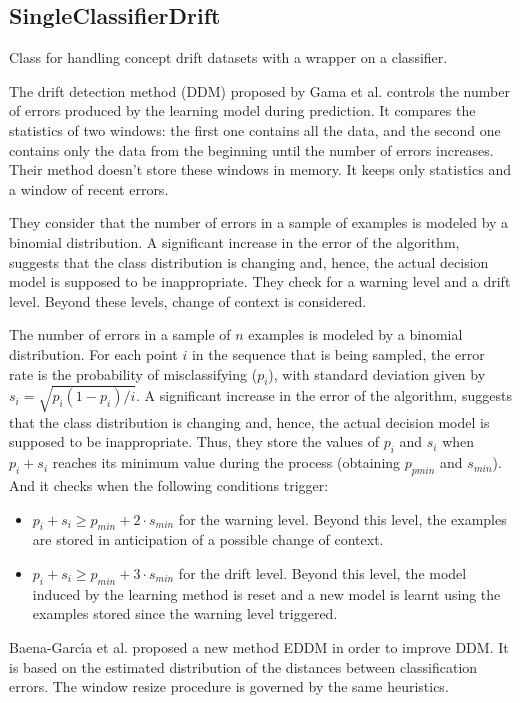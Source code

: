 \documentclass[a4paper,12pt,twoside]{book}
\begin{document}
\subsection{SingleClassifierDrift} Class for handling concept drift datasets with a wrapper on a
 classifier.

The drift detection method (DDM) proposed by Gama et al. controls 
the number of errors produced by the learning model during prediction. 
It compares the statistics of two windows: the first one contains all the data, 
and the second one contains only the data from the beginning until the number of
errors increases. Their method doesn't store these windows in memory. It keeps 
only statistics and a window of recent errors.

They consider that the number of errors in a sample of examples is modeled by a binomial 
distribution. A significant increase in the error of the algorithm, suggests
that the class distribution is changing and, hence, the actual decision model is
supposed to be inappropriate. They check for a warning level and a drift level. Beyond
these levels, change of context is considered.

The number of errors in a sample of $n$ examples is modeled by a binomial 
distribution. For each point $i$ in the sequence that is being sampled, the error
rate is the probability of misclassifying ($p_i$), with standard deviation given
by $s_i = \sqrt{p_i(1 - p_i)/i}$. 
A significant increase in the error of the algorithm, suggests
that the class distribution is changing and, hence, the actual decision model is
supposed to be inappropriate. Thus, they store the values of $p_i$ and $s_i$ when
$p_i+s_i$ reaches its minimum value during the process (obtaining $p_{pmin}$ and $s_{min}$).
And it checks when the following conditions trigger:
\begin{itemize}
\item $p_i + s_i \geq p_{min} + 2 \cdot s_{min}$ for the warning level. 
	Beyond this level, the examples are stored in anticipation of a possible
	change of context.
\item $p_i + s_i \geq p_{min} + 3 \cdot s_{min}$ for the drift level. Beyond this
	level, the model induced by the learning method is reset and a new model
	is learnt using the examples stored since the warning level triggered.
\end{itemize}

Baena-Garc\'{\i}a et al. proposed a new method EDDM in order to improve DDM. 
It is based on the estimated distribution of the distances between classification errors.
The window resize procedure is governed by the same heuristics.
\end{document}
